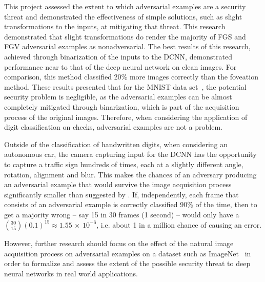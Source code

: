 \documentclass[conference]{IEEEtran}
\begin{document}
This project assessed the extent to which adversarial examples are a security threat and demonstrated the effectiveness of simple solutions, such as slight transformations to the inputs, at mitigating that threat.  This research demonstrated that slight transformations do render the majority of FGS and FGV adversarial examples as nonadversarial.  The best results of this research, achieved through binarization of the inputs to the DCNN, demonstrated performance near to that of the deep neural network on clean images.  For comparison, this method classified 20\% more images correctly than the foveation method.  These results presented that for the MNIST data set~\cite{c9}, the potential security problem is negligible, as the adversarial examples can be almost completely mitigated through binarization, which is part of the acquisition process of the original images.  Therefore, when considering the application of digit classification on checks, adversarial examples are not a problem.\par  
Outside of the classification of handwritten digits, when considering an autonomous car, the camera capturing input for the DCNN has the opportunity to capture a traffic sign hundreds of times, each at a slightly different angle, rotation, alignment and blur.  This makes the chances of an adversary producing an adversarial example that would survive the image acquisition process significantly smaller than suggested by \cite{c23}.  If, independently, each frame that consists of an adversarial example is correctly classified 90\% of the time, then to get a majority wrong -- say 15 in 30 frames (1 second) -- would only have a ${30 \choose 15}(0.1)^{15} \approx 1.55\,\times\,10^{-6}$, i.e. about 1 in a million chance of causing an error.  \par
However, further research should focus on the effect of the natural image acquisition process on adversarial examples on a dataset such as ImageNet~\cite{c17} in order to formalize and assess the extent of the possible security threat to deep neural networks in real world applications.\par
\end{document}
